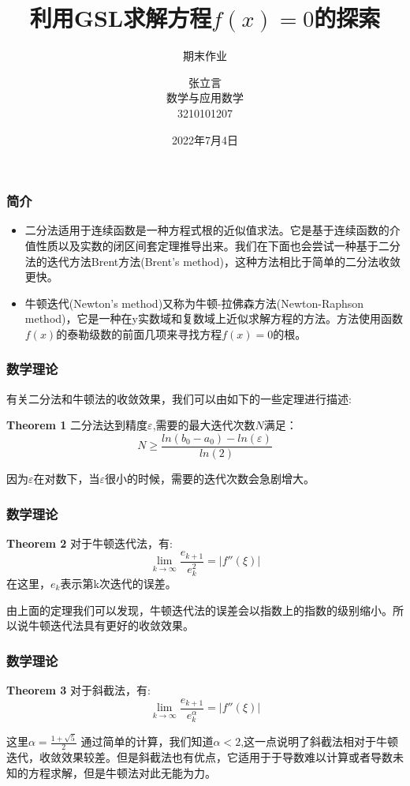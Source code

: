 \documentclass{beamer}
\title{利用GSL求解方程$f(x)=0$的探索}
\subtitle{期末作业}
\author{张立言\\数学与应用数学\\3210101207}
\institute{浙江大学数学科学学院}
\date{2022年7月4日}
\begin{document}
\frame{\titlepage}

\begin{frame}
\frametitle{简介}
\begin{itemize}
\item 二分法适用于连续函数是一种方程式根的近似值求法。它是基于连续函数的介值性质以及实数的闭区间套定理推导出来。我们在下面也会尝试一种基于二分法的迭代方法Brent方法(Brent's method)，这种方法相比于简单的二分法收敛更快。
\item 牛顿迭代(Newton's method)又称为牛顿-拉佛森方法(Newton-Raphson method)，它是一种在y实数域和复数域上近似求解方程的方法。方法使用函数$f(x)$的泰勒级数的前面几项来寻找方程$f(x)=0$的根。
\end{itemize}
\end{frame}

\begin{frame}
\frametitle{数学理论}

有关二分法和牛顿法的收敛效果，我们可以由如下的一些定理进行描述:

\textbf{Theorem 1}{} 二分法达到精度$\varepsilon$,需要的最大迭代次数$N$满足：
\begin{equation}
  N \ge \frac{ln(b_0-a_0)-ln(\varepsilon)}{ln(2)}
\end{equation}

因为$\varepsilon$在对数下，当$\varepsilon$很小的时候，需要的迭代次数会急剧增大。
\end{frame}

\begin{frame}
\frametitle{数学理论}
\textbf{Theorem 2}{} 对于牛顿迭代法，有:
\begin{equation}
   \lim_{k \to \infty} \frac{e_{k+1}}{e_k^2} = |f''(\xi)|
\end{equation}
在这里，$e_k$表示第k次迭代的误差。\par
由上面的定理我们可以发现，牛顿迭代法的误差会以指数上的指数的级别缩小。所以说牛顿迭代法具有更好的收敛效果。\par
\end{frame}
\begin{frame}
\frametitle{数学理论}
\textbf{Theorem 3}{} 对于斜截法，有:
\begin{equation}
   \lim_{k \to \infty} \frac{e_{k+1}}{e_k^{\alpha}} = |f''(\xi)|
\end{equation}\par
这里$\alpha=\frac{1+\sqrt{5}}{2}$
通过简单的计算，我们知道$\alpha < 2$,这一点说明了斜截法相对于牛顿迭代，收敛效果较差。但是斜截法也有优点，它适用于于导数难以计算或者导数未知的方程求解，但是牛顿法对此无能为力。
\end{frame}
\end{document}
